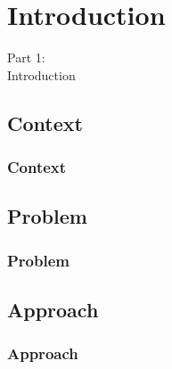 \section{Introduction}
\begin{frame}
  \vspace{25mm}
  \begin{center}
    \Huge{Part 1:\\Introduction}
  \end{center}
\end{frame}

\subsection{Context}
\begin{frame}[fragile]
  \frametitle{Context}
  \vspace{3mm}
  
\end{frame}

\subsection{Problem}
\begin{frame}[fragile]
  \frametitle{Problem}
  \vspace{3mm}
  
\end{frame}

\subsection{Approach}
\begin{frame}[fragile]
  \frametitle{Approach}
  \vspace{3mm}
  
\end{frame}

